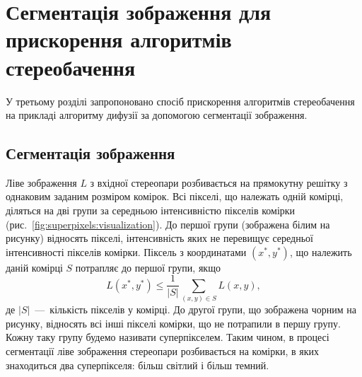 \chapter{Сегментація зображення для прискорення алгоритмів стереобачення}

У третьому розділі запропоновано спосіб прискорення алгоритмів стереобачення
на прикладі алгоритму дифузії за допомогою сегментації зображення.


\section{Сегментація зображення}

Ліве зображення $L$ з вхідної стереопари
розбивається на прямокутну решітку з однаковим заданим розміром комірок.
Всі пікселі, що належать одній комірці,
діляться на дві групи за середньою інтенсивністю пікселів комірки
(рис.~\ref{fig:superpixels:visualization}).
До першої групи (зображена білим на рисунку) відносять пікселі,
інтенсивність яких не перевищує середньої інтенсивності пікселів комірки.
Піксель з координатами $\left(x^*, y^* \right)$, що належить даній комірці $S$
потрапляє до першої групи, якщо
\begin{equation*}
    L \left(x^*, y^* \right) \le
        \frac{1}{ \left| S \right| }
        \sum \limits_{\left(x, y \right) \in S} L \left(x, y \right),
\end{equation*}
де $ \left| S \right|$~---~кількість пікселів у комірці.
До другої групи, що зображена чорним на рисунку,
відносять всі інші пікселі комірки, що не потрапили в першу групу.
Кожну таку групу будемо називати суперпікселем.
Таким чином, в процесі сегментації ліве зображення
стереопари розбивається на комірки, в яких знаходиться два суперпікселя:
більш світлий і більш темний.

